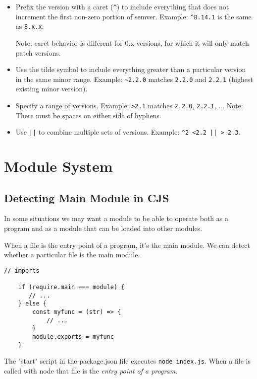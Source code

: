 \documentclass{scrartcl}
\begin{document}
\begin{itemize}
    \item Prefix the version with a caret (\lstinline|^|) to include everything that does not increment the first non-zero portion of semver. Example: \lstinline|^8.14.1| is the same as \lstinline|8.x.x|.

    Note:  caret behavior is different for 0.x versions, for which it will only match patch versions.
    \item Use the tilde symbol to include everything greater than a particular version in the same minor range. Example: \lstinline|~2.2.0| matches \lstinline|2.2.0| and \lstinline|2.2.1| (highest existing minor version).
    \item Specify a range of versions. Example: \lstinline|>2.1| matches \lstinline|2.2.0|,
    \lstinline|2.2.1|, ... Note: There must be spaces on either side of hyphens.
    \item Use \lstinline{||} to combine multiple sets of versions. Example: \lstinline{^2 <2.2 || > 2.3}.

\end{itemize}

\section{Module System}

\subsection{Detecting Main Module in CJS}

In some situations we may want a module to be able to operate both as a program and as a module that can be loaded into other modules.

When a file is the entry point of a program, it's the main module. We can detect whether a particular file is the main module.

\begin{lstlisting}[style=ES6]
    // imports

    if (require.main === module) {
       // ...
    } else {
        const myfunc = (str) => {
            // ...
        }
        module.exports = myfunc
    }
\end{lstlisting}

The "start" script in the package.json file executes \lstinline|node index.js|. When a file is called with node that file is the \textit{entry point of a program}.
\end{document}
